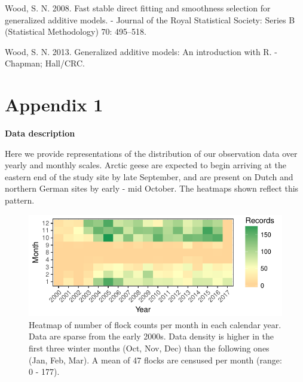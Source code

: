 \documentclass[10pt,twocolumn]{paper}
\begin{document}
\hypertarget{ref-wood2008fast}{}
Wood, S. N. 2008. Fast stable direct fitting and smoothness selection
for generalized additive models. - Journal of the Royal Statistical
Society: Series B (Statistical Methodology) 70: 495--518.

\hypertarget{ref-wood2013gam}{}
Wood, S. N. 2013. Generalized additive models: An introduction with R. -
Chapman; Hall/CRC.

\normalsize

\clearpage

\setcounter{table}{0} \renewcommand{\thetable}{A\arabic{table}}

\renewcommand\thefigure{A\arabic{figure}}

\section{Appendix 1}\label{appendix-1}

\setcounter{figure}{0}

\textbf{Data description} 

Here we provide representations of the distribution of our observation data over yearly and monthly scales. Arctic geese are expected to begin arriving at the eastern end of the study site by late September, and are present on Dutch and northern German sites by early - mid October. The heatmaps shown reflect this pattern.

\begin{figure}[H]
\includegraphics[width = 1.5\linewidth]{data_density.pdf}
\caption{{\small Heatmap of number of flock counts per month in each calendar year. Data are sparse from the early 2000s. Data density is higher in the first three winter months (Oct, Nov, Dec) than the following ones (Jan, Feb, Mar). A mean of 47 flocks are censused per month (range: 0 - 177).}}

\end{figure}
\end{document}
